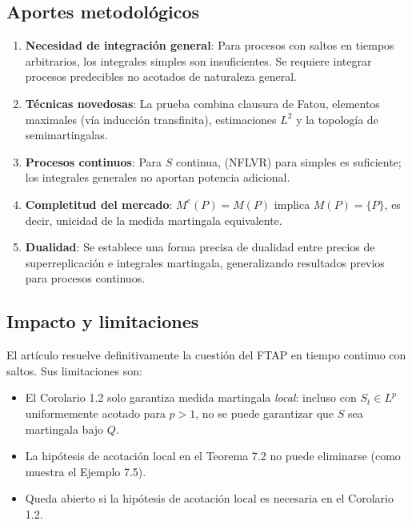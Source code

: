 \documentclass[12pt]{article}
\begin{document}
\subsection{Aportes metodol\'ogicos}

\begin{enumerate}
    \item \textbf{Necesidad de integraci\'on general}: Para procesos con saltos en tiempos arbitrarios, los integrales simples son insuficientes. Se requiere integrar procesos predecibles no acotados de naturaleza general.
    \item \textbf{T\'ecnicas novedosas}: La prueba combina clausura de Fatou, elementos maximales (v\'ia inducci\'on transfinita), estimaciones $L^2$ y la topolog\'ia de semimartingalas.
    \item \textbf{Procesos continuos}: Para $S$ continua, (NFLVR) para simples es suficiente; los integrales generales no aportan potencia adicional.
    \item \textbf{Completitud del mercado}: $M^e(P) = M(P)$ implica $M(P) = \{P\}$, es decir, unicidad de la medida martingala equivalente.
    \item \textbf{Dualidad}: Se establece una forma precisa de dualidad entre precios de superreplicaci\'on e integrales martingala, generalizando resultados previos para procesos continuos.
\end{enumerate}

\subsection{Impacto y limitaciones}

El art\'iculo resuelve definitivamente la cuesti\'on del FTAP en tiempo continuo con saltos. Sus limitaciones son:
\begin{itemize}
    \item El Corolario 1.2 solo garantiza medida martingala \emph{local}: incluso con $S_t \in L^p$ uniformemente acotado para $p > 1$, no se puede garantizar que $S$ sea martingala bajo $Q$.
    \item La hip\'otesis de acotaci\'on local en el Teorema 7.2 no puede eliminarse (como muestra el Ejemplo 7.5).
    \item Queda abierto si la hip\'otesis de acotaci\'on local es necesaria en el Corolario 1.2.
\end{itemize}
\end{document}
